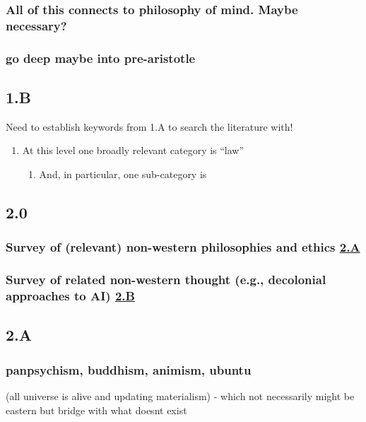 \documentclass[11pt]{article}
\begin{document}
\subsubsection{All of this connects to philosophy of mind. Maybe necessary?}
\label{sec:orgb0a52e0}
\subsubsection{go deep maybe into pre-aristotle}
\label{sec:orgf4f0cd1}

\subsection{1.B}
\label{sec:org1be32c3}

Need to establish keywords from 1.A to search the literature with!
\begin{enumerate}
\item At this level one broadly relevant category is ``law''
\label{sec:org0b1c46a}
\begin{enumerate}
\item And, in particular, one sub-category is
\label{sec:org03fa69e}
\end{enumerate}
\end{enumerate}
\subsection{2.0}
\label{sec:org017783c}

\subsubsection{Survey of (relevant) non-western philosophies and ethics \hyperref[sec:orgb61553b]{2.A}}
\label{sec:orgeb3534c}
\subsubsection{Survey of related non-western thought (e.g., \textbf{decolonial approaches} to AI) \hyperref[sec:orgfaccdba]{2.B}}
\label{sec:orge7ef739}
\subsection{2.A}
\label{sec:orgb61553b}

\subsubsection{panpsychism, buddhism, animism, ubuntu}
\label{sec:org399718d}
(all universe is alive and updating materialism) - which not
necessarily might be eastern but bridge with what doesnt exist
\end{document}
